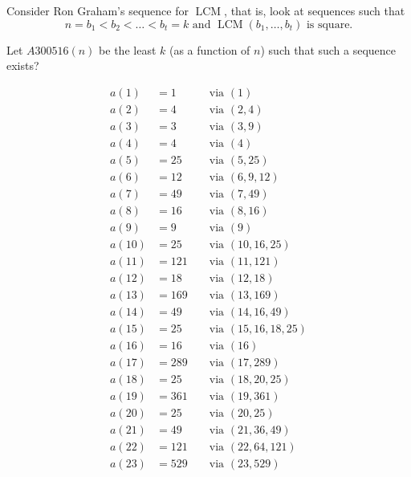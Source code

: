 \documentclass{article}
\begin{document}
Consider Ron Graham's sequence for $\operatorname{LCM}$, that is, look at sequences such that \[
  n = b_1 < b_2 < \hdots < b_t = k \text{ and } \operatorname{LCM}(b_1,\hdots,b_t) \text{ is square.}
\]
\begin{question}
  Let $A300516(n)$ be the least $k$ (as a function of $n$) such that such a sequence
  exists?
\end{question}
\begin{figure}[h]
  \centering
  \allowdisplaybreaks
  \begin{multicols}{3}
    \noindent
    \begin{alignat*}{2}
      a(1)  &= 1  &&\text{ via } (1)\\
      a(2)  &= 4  &&\text{ via } (2, 4)\\
      a(3)  &= 3  &&\text{ via } (3, 9)\\
      a(4)  &= 4  &&\text{ via } (4)\\
      a(5)  &= 25 &&\text{ via } (5, 25)\\
      a(6)  &= 12 &&\text{ via } (6, 9, 12)\\
      a(7)  &= 49 &&\text{ via } (7, 49)\\
      a(8)  &= 16 &&\text{ via } (8, 16)\\
      a(9)  &= 9  &&\text{ via } (9)\\
      a(10) &= 25 &&\text{ via } (10, 16, 25)\\
      a(11) &= 121 &&\text{ via } (11, 121)\\
      a(12) &= 18  &&\text{ via } (12, 18)\\
      a(13) &= 169 &&\text{ via } (13, 169)\\
      a(14) &= 49  &&\text{ via } (14, 16, 49)\\
      a(15) &= 25  &&\text{ via } (15, 16, 18, 25)\\
      a(16) &= 16  &&\text{ via } (16)\\
      a(17) &= 289 &&\text{ via } (17, 289)\\
      a(18) &= 25  &&\text{ via } (18, 20, 25)\\
      a(19) &= 361 &&\text{ via } (19, 361)\\
      a(20) &= 25  &&\text{ via } (20, 25)\\
      a(21) &= 49  &&\text{ via } (21, 36, 49)\\
      a(22) &= 121 &&\text{ via } (22, 64, 121)\\
      a(23) &= 529 &&\text{ via } (23, 529)\\

\end{alignat*}
\end{multicols}
\end{figure}
\end{document}
